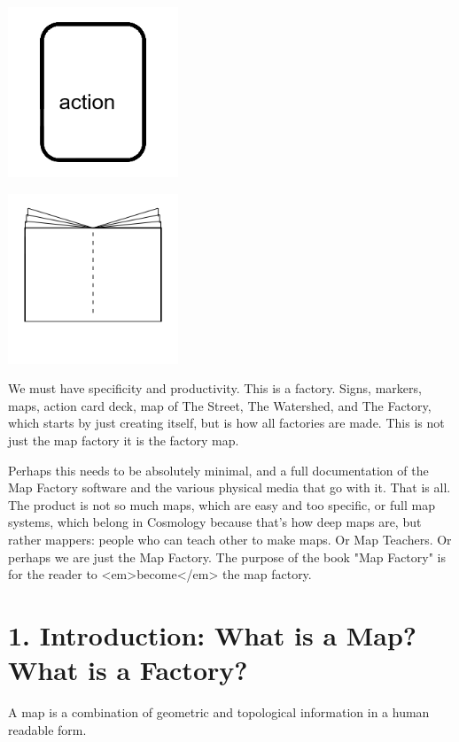 \documentclass[11pt]{article}
\begin{document}
\includegraphics[width=2in]{mapfactory_images/actioncard-symbol.png}





\includegraphics[width=2in]{mapfactory_images/book-symbol.png}


We must have specificity and productivity.  This is a factory. Signs, markers, maps, action card deck, map of The Street, The Watershed, and The Factory, which starts by just creating itself, but is how all factories are made.  This is not just the map factory it is the factory map.




Perhaps this needs to be absolutely minimal, and a full documentation of the Map Factory software and the various physical media that go with it.  That is all. The product is not so much maps, which are easy and too specific, or full map systems, which belong in Cosmology because that's how deep maps are, but rather mappers: people who can teach other to make maps.  Or Map Teachers.  Or perhaps we are just the Map Factory.  The purpose of the book "Map Factory" is for the reader to <em>become</em> the map factory.  



\section{1. Introduction: What is a Map? What is a Factory?}


A map is a combination of geometric and topological information in a human readable form.  
\end{document}
